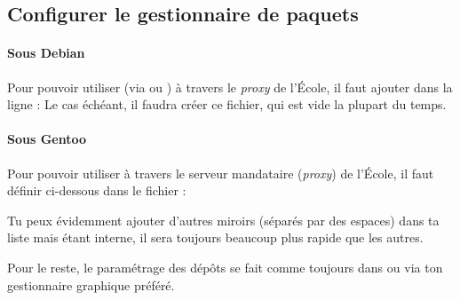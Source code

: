 \subsection{Configurer le gestionnaire de paquets}




\paragraph{Sous Debian}
\label{debian_mirror} Pour pouvoir utiliser  (via  ou ) à travers le \emph{proxy} de l'École, il faut ajouter dans  la ligne :
Le cas échéant, il faudra créer ce fichier, qui est vide la plupart du temps.

\paragraph{Sous Gentoo}
\label{gentoo_mirror} Pour pouvoir utiliser  à  travers le serveur mandataire (\emph{proxy}) de l'École, il faut définir %
ci-dessous dans le fichier  :

Tu peux évidemment ajouter d'autres miroirs (séparés par des espaces) dans ta liste mais  étant interne, il sera toujours beaucoup plus rapide que les autres.


Pour le reste, le paramétrage des dépôts se fait comme toujours dans  ou via ton gestionnaire graphique préféré.
